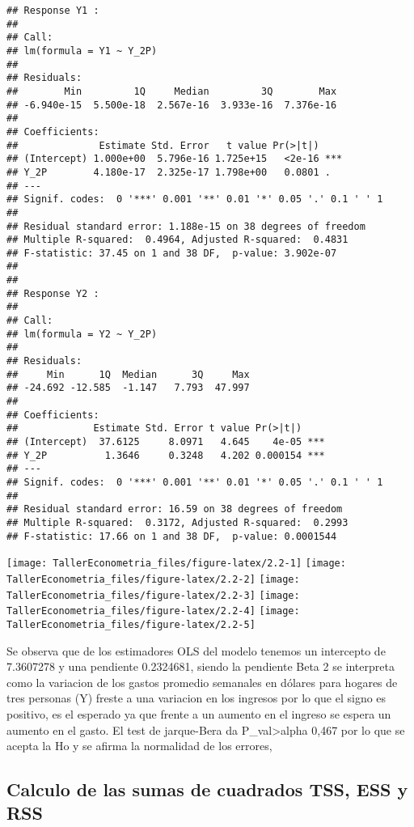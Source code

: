\documentclass[
]{article}
\begin{document}
\begin{verbatim}
## Response Y1 :
## 
## Call:
## lm(formula = Y1 ~ Y_2P)
## 
## Residuals:
##        Min         1Q     Median         3Q        Max 
## -6.940e-15  5.500e-18  2.567e-16  3.933e-16  7.376e-16 
## 
## Coefficients:
##              Estimate Std. Error   t value Pr(>|t|)    
## (Intercept) 1.000e+00  5.796e-16 1.725e+15   <2e-16 ***
## Y_2P        4.180e-17  2.325e-17 1.798e+00   0.0801 .  
## ---
## Signif. codes:  0 '***' 0.001 '**' 0.01 '*' 0.05 '.' 0.1 ' ' 1
## 
## Residual standard error: 1.188e-15 on 38 degrees of freedom
## Multiple R-squared:  0.4964, Adjusted R-squared:  0.4831 
## F-statistic: 37.45 on 1 and 38 DF,  p-value: 3.902e-07
## 
## 
## Response Y2 :
## 
## Call:
## lm(formula = Y2 ~ Y_2P)
## 
## Residuals:
##     Min      1Q  Median      3Q     Max 
## -24.692 -12.585  -1.147   7.793  47.997 
## 
## Coefficients:
##             Estimate Std. Error t value Pr(>|t|)    
## (Intercept)  37.6125     8.0971   4.645    4e-05 ***
## Y_2P          1.3646     0.3248   4.202 0.000154 ***
## ---
## Signif. codes:  0 '***' 0.001 '**' 0.01 '*' 0.05 '.' 0.1 ' ' 1
## 
## Residual standard error: 16.59 on 38 degrees of freedom
## Multiple R-squared:  0.3172, Adjusted R-squared:  0.2993 
## F-statistic: 17.66 on 1 and 38 DF,  p-value: 0.0001544
\end{verbatim}

\begin{center}\texttt{[image: TallerEconometria\_files/figure-latex/2.2-1]} \texttt{[image: TallerEconometria\_files/figure-latex/2.2-2]} \texttt{[image: TallerEconometria\_files/figure-latex/2.2-3]} \texttt{[image: TallerEconometria\_files/figure-latex/2.2-4]} \texttt{[image: TallerEconometria\_files/figure-latex/2.2-5]} \end{center}

Se observa que de los estimadores OLS del modelo tenemos un intercepto
de 7.3607278 y una pendiente 0.2324681, siendo la pendiente Beta 2 se
interpreta como la variacion de los gastos promedio semanales en dólares
para hogares de tres personas (Y) freste a una variacion en los ingresos
por lo que el signo es positivo, es el esperado ya que frente a un
aumento en el ingreso se espera un aumento en el gasto. El test de
jarque-Bera da P\_val\textgreater alpha 0,467 por lo que se acepta la Ho
y se afirma la normalidad de los errores,

\hypertarget{calculo-de-las-sumas-de-cuadrados-tss-ess-y-rss}{%
\subsection{Calculo de las sumas de cuadrados TSS, ESS y
RSS}\label{calculo-de-las-sumas-de-cuadrados-tss-ess-y-rss}}
\end{document}
